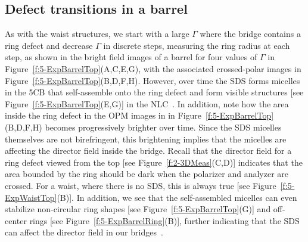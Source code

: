 \subsection{Defect transitions in a barrel}
As with the waist structures, we start with a large $\Gamma$ where the bridge contains a ring defect and decrease $\Gamma$ in discrete steps, measuring the ring radius at each step, as shown in the bright field images of a barrel for four values of $\Gamma$ in Figure~\ref{f:5-ExpBarrelTop}(A,C,E,G), with the associated crossed-polar images in Figure~\ref{f:5-ExpBarrelTop}(B,D,F,H).
However, over time the SDS forms micelles in the 5CB that self-assemble onto the ring defect and form visible structures [see Figure~\ref{f:5-ExpBarrelTop}(E,G)] in the NLC~\cite{RN279}.
In addition, note how the area inside the ring defect in the OPM images in in Figure~\ref{f:5-ExpBarrelTop}(B,D,F,H) becomes progressively brighter over time.
Since the SDS micelles themselves are not birefringent, this brightening implies that the micelles are affecting the director field inside the bridge.
Recall that the director field for a ring defect viewed from the top [see Figure~\ref{f:2-3DMeas}(C,D)] indicates that the area bounded by the ring should be dark when the polarizer and analyzer are crossed.
For a waist, where there is no SDS, this is always true [see Figure~\ref{f:5-ExpWaistTop}(B)].
In addition, we see that the self-assembled micelles can even stabilize non-circular ring shapes [see Figure~\ref{f:5-ExpBarrelTop}(G)] and off-center rings [see Figure~\ref{f:5-ExpBarrelRing}(B)], further indicating that the SDS can affect the director field in our bridges~\cite{RN279,RN280}.
